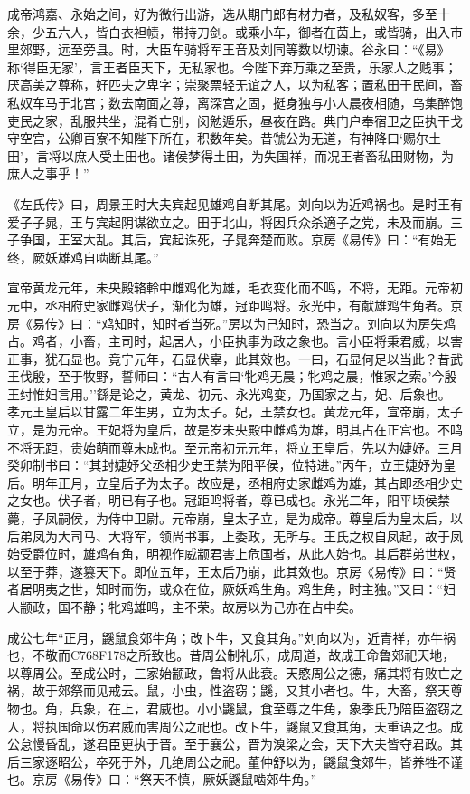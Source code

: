 \documentclass[]{article}
\begin{document}
成帝鸿嘉、永始之间，好为微行出游，选从期门郎有材力者，及私奴客，多至十余，少五六人，皆白衣袒帻，带持刀剑。或乘小车，御者在茵上，或皆骑，出入市里郊野，远至旁县。时，大臣车骑将军王音及刘同等数以切谏。谷永曰：``《易》称`得臣无家'，言王者臣天下，无私家也。今陛下弃万乘之至贵，乐家人之贱事；厌高美之尊称，好匹夫之卑字；崇聚票轻无谊之人，以为私客；置私田于民间，畜私奴车马于北宫；数去南面之尊，离深宫之固，挺身独与小人晨夜相随，乌集醉饱吏民之家，乱服共坐，混肴亡别，闵勉遁乐，昼夜在路。典门户奉宿卫之臣执干戈守空宫，公卿百寮不知陛下所在，积数年矣。昔虢公为无道，有神降曰`赐尔土田'，言将以庶人受土田也。诸侯梦得土田，为失国祥，而况王者畜私田财物，为庶人之事乎！''

《左氏传》曰，周景王时大夫宾起见雄鸡自断其尾。刘向以为近鸡祸也。是时王有爱子子晁，王与宾起阴谋欲立之。田于北山，将因兵众杀適子之党，未及而崩。三子争国，王室大乱。其后，宾起诛死，子晁奔楚而败。京房《易传》曰：``有始无终，厥妖雄鸡自啮断其尾。''

宣帝黄龙元年，未央殿辂軨中雌鸡化为雄，毛衣变化而不鸣，不将，无距。元帝初元中，丞相府史家雌鸡伏子，渐化为雄，冠距鸣将。永光中，有献雄鸡生角者。京房《易传》曰：``鸡知时，知时者当死。''房以为己知时，恐当之。刘向以为房失鸡占。鸡者，小畜，主司时，起居人，小臣执事为政之象也。言小臣将秉君威，以害正事，犹石显也。竟宁元年，石显伏辜，此其效也。一曰，石显何足以当此？昔武王伐殷，至于牧野，誓师曰：``古人有言曰`牝鸡无晨；牝鸡之晨，惟家之索。'今殷王纣惟妇言用。''繇是论之，黄龙、初元、永光鸡变，乃国家之占，妃、后象也。孝元王皇后以甘露二年生男，立为太子。妃，王禁女也。黄龙元年，宣帝崩，太子立，是为元帝。王妃将为皇后，故是岁未央殿中雌鸡为雄，明其占在正宫也。不鸣不将无距，贵始萌而尊未成也。至元帝初元元年，将立王皇后，先以为婕妤。三月癸卯制书曰：``其封婕妤父丞相少史王禁为阳平侯，位特进。''丙午，立王婕妤为皇后。明年正月，立皇后子为太子。故应是，丞相府史家雌鸡为雄，其占即丞相少史之女也。伏子者，明已有子也。冠距鸣将者，尊已成也。永光二年，阳平顷侯禁薨，子凤嗣侯，为侍中卫尉。元帝崩，皇太子立，是为成帝。尊皇后为皇太后，以后弟凤为大司马、大将军，领尚书事，上委政，无所与。王氏之权自凤起，故于凤始受爵位时，雄鸡有角，明视作威颛君害上危国者，从此人始也。其后群弟世权，以至于莽，遂篡天下。即位五年，王太后乃崩，此其效也。京房《易传》曰：``贤者居明夷之世，知时而伤，或众在位，厥妖鸡生角。鸡生角，时主独。''又曰：``妇人颛政，国不静；牝鸡雄鸣，主不荣。故房以为己亦在占中矣。

成公七年``正月，鼷鼠食郊牛角；改卜牛，又食其角。''刘向以为，近青祥，亦牛祸也，不敬而C768F178之所致也。昔周公制礼乐，成周道，故成王命鲁郊祀天地，以尊周公。至成公时，三家始颛政，鲁将从此衰。天愍周公之德，痛其将有败亡之祸，故于郊祭而见戒云。鼠，小虫，性盗窃；鼷，又其小者也。牛，大畜，祭天尊物也。角，兵象，在上，君威也。小小鼷鼠，食至尊之牛角，象季氏乃陪臣盗窃之人，将执国命以伤君威而害周公之祀也。改卜牛，鼷鼠又食其角，天重语之也。成公怠慢昏乱，遂君臣更执于晋。至于襄公，晋为溴梁之会，天下大夫皆夺君政。其后三家逐昭公，卒死于外，几绝周公之祀。董仲舒以为，鼷鼠食郊牛，皆养牲不谨也。京房《易传》曰：``祭天不慎，厥妖鼷鼠啮郊牛角。''
\end{document}
